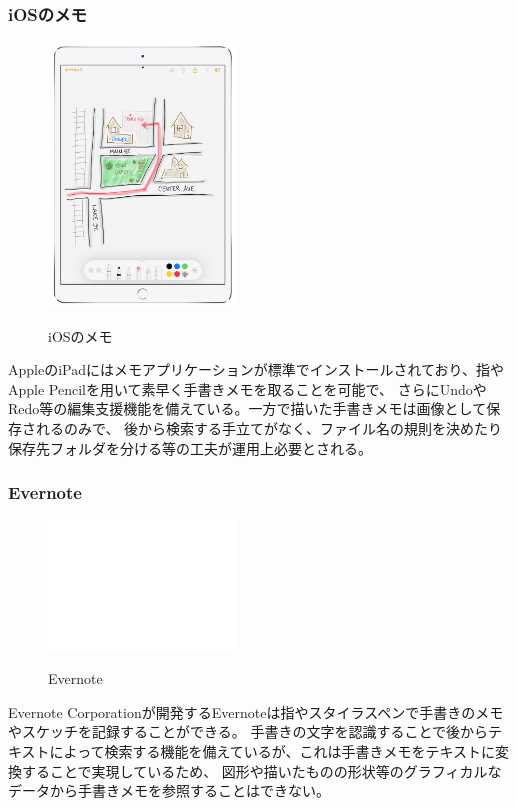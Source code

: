 \subsubsection{iOSのメモ}

\begin{figure}[htbp]
    \begin{center}
        {\includegraphics[width=50mm]{images/applememo.png}} \end{center}
    \caption{iOSのメモ}
\end{figure}

AppleのiPadにはメモアプリケーションが標準でインストールされており、指やApple Pencilを用いて素早く手書きメモを取ることを可能で、
さらにUndoやRedo等の編集支援機能を備えている。一方で描いた手書きメモは画像として保存されるのみで、
後から検索する手立てがなく、ファイル名の規則を決めたり保存先フォルダを分ける等の工夫が運用上必要とされる。

\subsubsection{Evernote}

\begin{figure}[htbp]
    \begin{center}
    {\includegraphics[width=50mm]{images/testimage.png}} \end{center}
    \caption{Evernote}
\end{figure}

Evernote Corporationが開発するEvernoteは指やスタイラスペンで手書きのメモやスケッチを記録することができる。
手書きの文字を認識することで後からテキストによって検索する機能を備えているが、これは手書きメモをテキストに変換することで実現しているため、
図形や描いたものの形状等のグラフィカルなデータから手書きメモを参照することはできない。


